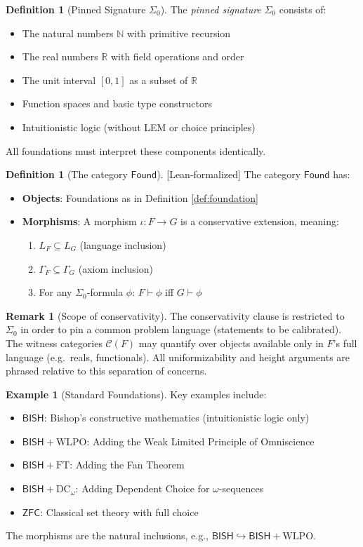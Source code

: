 \documentclass[11pt]{article}
\theoremstyle{plain}
\theoremstyle{definition}
\newtheorem{definition}[theorem]{Definition}
\newtheorem{example}[theorem]{Example}
\newtheorem{remark}[theorem]{Remark}
\newcommand{\N}{\mathbb{N}}
\newcommand{\R}{\mathbb{R}}
\newcommand{\WLPO}{\mathrm{WLPO}}
\newcommand{\FT}{\mathrm{FT}}
\newcommand{\DCw}{\mathrm{DC}_\omega}
\newcommand{\BISH}{\mathsf{BISH}}
\newcommand{\ZFC}{\mathsf{ZFC}}
\newcommand{\Found}{\mathsf{Found}}
\newcommand{\SigmaZero}{\Sigma_{0}}
\newcommand{\leanok}{\textsf{\textcolor{green!70!black}{[Lean-formalized]}}}
\begin{document}
\begin{definition}[Pinned Signature $\SigmaZero$]\label{def:sigma0}
The \emph{pinned signature} $\SigmaZero$ consists of:
\begin{itemize}
\item The natural numbers $\N$ with primitive recursion
\item The real numbers $\R$ with field operations and order
\item The unit interval $[0,1]$ as a subset of $\R$
\item Function spaces and basic type constructors
\item Intuitionistic logic (without LEM or choice principles)
\end{itemize}
All foundations must interpret these components identically.
\end{definition}

\begin{definition}[The category $\Found$] \leanok
The category $\Found$ has:
\begin{itemize}
\item \textbf{Objects}: Foundations as in Definition \ref{def:foundation}
\item \textbf{Morphisms}: A morphism $\iota: F \to G$ is a conservative extension, meaning:
  \begin{enumerate}
  \item $L_F \subseteq L_G$ (language inclusion)
  \item $\Gamma_F \subseteq \Gamma_G$ (axiom inclusion)
  \item For any $\SigmaZero$-formula $\phi$: $F \vdash \phi$ iff $G \vdash \phi$
  \end{enumerate}
\end{itemize}
\end{definition}

\begin{remark}[Scope of conservativity]\label{rem:conservativity-scope}
The conservativity clause is restricted to $\SigmaZero$ in order to pin a common problem language (statements to be calibrated). The witness categories $\mathcal C(F)$ may quantify over objects available only in $F$'s full language (e.g.\ reals, functionals). All uniformizability and height arguments are phrased relative to this separation of concerns.
\end{remark}

\begin{example}[Standard Foundations]
Key examples include:
\begin{itemize}
\item $\BISH$: Bishop's constructive mathematics (intuitionistic logic only)
\item $\BISH + \WLPO$: Adding the Weak Limited Principle of Omniscience
\item $\BISH + \FT$: Adding the Fan Theorem
\item $\BISH + \DCw$: Adding Dependent Choice for $\omega$-sequences
\item $\ZFC$: Classical set theory with full choice
\end{itemize}
The morphisms are the natural inclusions, e.g., $\BISH \hookrightarrow \BISH + \WLPO$.
\end{example}
\end{document}

